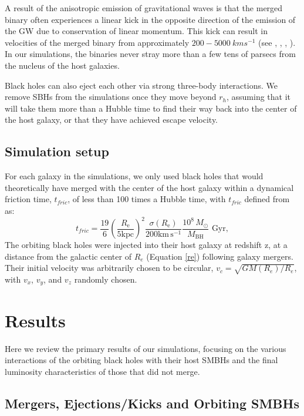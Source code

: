 \documentclass[fleqn,usenatbib,useAMS]{mnras}
\begin{document}
A result of the anisotropic emission of gravitational waves is that the merged binary often experiences a linear kick in the opposite direction of the emission of the GW due to conservation of linear momentum. This kick can result in velocities of the merged binary from approximately $200-5000\ km s^{-1}$ (see \citet{2007PhRvL..98w1101G}, \citet{2007PhRvL..98i1101G}, \citet{2007PhRvL..98w1102C}, \citet{2011PhRvL.107w1102L}).  In our simulations, the binaries never stray more than a few tens of parsecs from the nucleus of the host galaxies.

Black holes can also eject each other via strong three-body interactions. We remove SBHs from the simulations once they move beyond $r_h$, assuming that it will take them more than a Hubble time to find their way back into the center of the host galaxy, or that they have achieved escape velocity.

\subsection{Simulation setup}\label{subsec:simset}
For each galaxy in the simulations, we only used black holes that would theoretically have merged with the center of the host galaxy within a dynamical friction time, $t_{fric}$, of less than 100 times a Hubble time, with $t_{fric}$ defined from \citet{2008gady.book.....B} as:
\begin{equation}\label{tfric}
    t_{fric} = \frac{19}{6}\left(\frac{R_\mathrm{e}}{5\mathrm{kpc}}\right)^2\frac{\sigma(R_\mathrm{e})}{200\mathrm{km}\,\mathrm{s}^{-1}}\frac{10^8\,M_{\odot}}{M_\mathrm{BH}} \text{  Gyr},
\end{equation}
The orbiting black holes were injected into their host galaxy at redshift z, at a distance from the galactic center of $R_{e}$ (Equation \ref{re}) following galaxy mergers.  Their initial velocity was arbitrarily chosen to be circular, $v_c = \sqrt{GM(R_e)/R_e}$, with $v_x$, $v_y$, and $v_z$ randomly chosen.

\section{Results}\label{sec:results}
Here we review the primary results of our simulations, focusing on the various interactions of the orbiting black holes with their host SMBHs and the final luminosity characteristics of those that did not merge.

\subsection{Mergers, Ejections/Kicks and Orbiting SMBHs}
\end{document}
